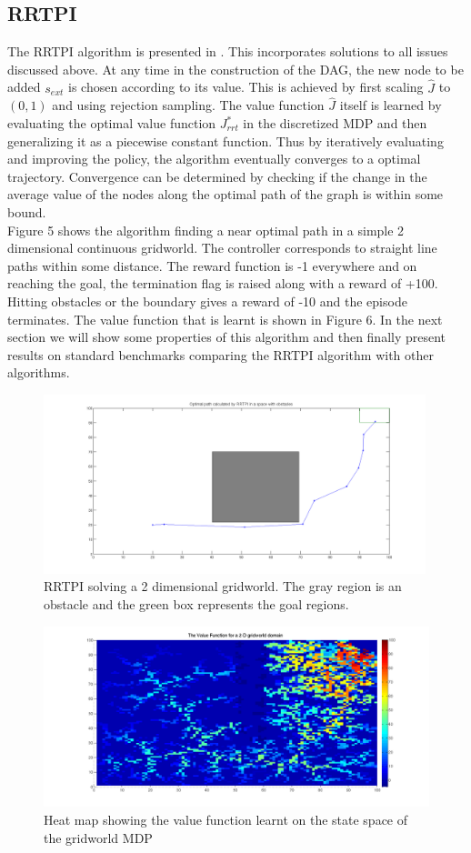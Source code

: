 \documentclass[wcp]{jmlr}
\begin{document}
\subsection*{RRTPI}
The RRTPI algorithm is presented in . This incorporates solutions to all issues discussed above. At any time in the construction of the DAG, the new node to be added $s_{ext}$ is chosen according to its value. This is achieved by first scaling $\hat{J}$ to $(0,1)$ and using rejection sampling. The value function $\hat{J}$ itself is learned by evaluating the optimal value function $J_{rrt}^*$ in the discretized MDP and then generalizing it as a piecewise constant function. Thus by iteratively evaluating and improving the policy, the algorithm eventually converges to a optimal trajectory.  Convergence can be determined by checking if the change in the average value of the nodes along the optimal path of the graph is within some bound.\\
Figure 5 shows the algorithm finding a near optimal path in a simple 2 dimensional continuous gridworld. The controller corresponds to straight line paths within some distance. The reward function is -1 everywhere and on reaching the goal, the termination flag is raised along with a reward of +100. Hitting obstacles or the boundary gives a reward of -10 and the episode terminates. The value function that is learnt is shown in Figure 6. In the next section we will show some properties of this algorithm and then finally present results on standard benchmarks comparing the RRTPI algorithm with other algorithms.

\begin{figure}[htb]
\centering
\label{fig:iter1}
\includegraphics[width=420px]{rrtpi1.png}
\caption{RRTPI solving a 2 dimensional gridworld. The gray region is an obstacle and the green box represents the goal regions.}
\end{figure}

\begin{figure}[htb]
\centering
\label{fig:val1}
\includegraphics[width=450px]{valufunction.png}
\caption{Heat map showing the value function learnt on the state space of the gridworld MDP}
\end{figure}
\end{document}
